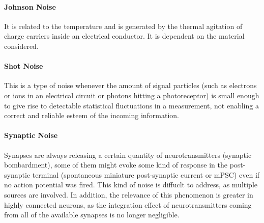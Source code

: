 \paragraph{Johnson Noise} It is related to the temperature and is generated by the thermal agitation of charge
carriers inside an electrical conductor. It is dependent on the material considered.
\paragraph{Shot Noise} This is a type of noise whenever the amount of signal particles (such as electrons or ions
in an electrical circuit or photons hitting a photoreceptor) is small enough to give rise to detectable
statistical fluctuations in a measurement, not enabling a correct and reliable esteem of the incoming
information.
\paragraph{Synaptic Noise} Synapses are always releasing a certain quantity of neurotransmitters
(synaptic bombardment), some of them might evoke some kind of response in the post-synaptic terminal
(spontaneous miniature post-synaptic current or mPSC) even if no
action potential was fired. This kind of noise is diffuclt to address, as multiple sources are involved.
In addition, the relevance of this phenomenon is greater in highly connected neurons, as the integration
effect of neurotransmitters coming from all of the available synapses is no longer negligible.

